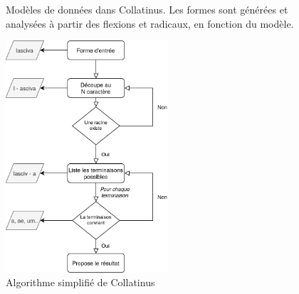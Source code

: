\begin{figure}[h]
    \centering
    \caption{Modèles de données dans Collatinus. Les formes sont générées et analysées à partir des flexions et radicaux, en fonction du modèle. }
    \label{lemmatisation:outils:collatinusDB}
\end{figure}


\begin{figure}[h]
    \centering
    \includegraphics[width=6cm]{results/lemmatisation/outils/collatinus.png}
    \caption{Algorithme simplifié de Collatinus}
    \label{lemmatisation:outils:collatinusAlgorythme}
\end{figure}

